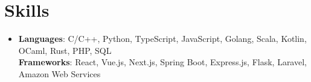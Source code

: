 \documentclass[letterpaper,10pt]{article}
\newcommand{\ulhref}[2]{\href{#1}{\underline{#2}}}
\newcommand{\resumeItem}[2]{
  \item\small{
    \textbf{#1}{: #2 \vspace{-2pt}}
  }
}
\newcommand{\resumeSubItem}[2]{\resumeItem{#1}{#2}\vspace{-4pt}}
\newcommand{\resumeSubHeadingListStart}{\begin{itemize}[leftmargin=*, label={}]}
\newcommand{\resumeSubHeadingListEnd}{\end{itemize}}
\newcommand{\resumeProjectSubHeadingListStart}{\begin{itemize}[leftmargin=*, label=\textbullet]}
\newcommand{\resumeProjectSubHeadingListEnd}{\end{itemize}}
\begin{document}


\section{Skills}
 \resumeSubHeadingListStart
   \item{
	\textbf
     {Languages}{: C/C++, Python, TypeScript, JavaScript, Golang, Scala, Kotlin, OCaml,
     Rust, PHP, SQL}
	\\
	\textbf{Frameworks}{: React, Vue.js, Next.js, Spring Boot, Express.js, Flask, Laravel, Amazon Web Services }
   }
 \resumeSubHeadingListEnd

\end{document}
